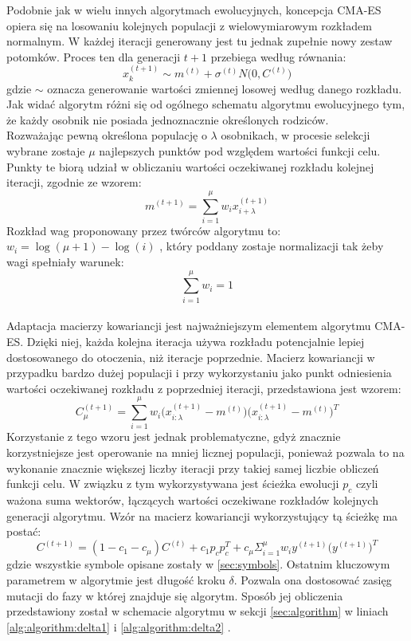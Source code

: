\documentclass[10pt]{article}
\begin{document}
Podobnie jak w wielu innych algorytmach ewolucyjnych, koncepcja CMA-ES opiera się na losowaniu kolejnych populacji z wielowymiarowym rozkładem normalnym. W każdej  iteracji generowany jest tu jednak zupełnie nowy zestaw potomków. Proces ten dla generacji $t+1$ przebiega według równania: $$x_k^{(t+1)} \sim m^{(t)} + \sigma^{(t)}N \big(0,C^{(t)}\big)$$ gdzie $\sim$ oznacza generowanie wartości zmiennej losowej według danego rozkładu. Jak widać algorytm różni się od ogólnego schematu algorytmu ewolucyjnego tym, że każdy osobnik nie posiada jednoznacznie określonych rodziców.\\
Rozważając pewną określona populację o $\lambda$ osobnikach, w procesie selekcji wybrane zostaje $\mu$ najlepszych punktów pod względem wartości funkcji celu. Punkty te biorą udział w obliczaniu wartości oczekiwanej rozkładu kolejnej iteracji, zgodnie ze wzorem:
$$m^{(t+1)} = \sum^{\mu}_{i=1}w_ix_{i+\lambda}^{(t+1)}$$
Rozkład wag proponowany przez twórców algorytmu to: $w_i = \log (\mu + 1) - \log (i)$ , który poddany zostaje normalizacji tak żeby wagi spełniały warunek: $$\sum ^{\mu}_{i=1}w_i = 1$$
\\
Adaptacja macierzy kowariancji jest najważniejszym elementem algorytmu CMA-ES. Dzięki niej, każda kolejna iteracja używa rozkładu potencjalnie lepiej dostosowanego do otoczenia, niż iteracje poprzednie.
Macierz kowariancji w przypadku bardzo dużej populacji i przy wykorzystaniu jako punkt odniesienia wartości oczekiwanej rozkładu z poprzedniej iteracji, przedstawiona jest wzorem: 
 $$C_\mu^{(t+1)} = \sum^\mu_{i=1} w_i \big(x_{i:\lambda}^{(t+1)} - m^{(t)}\big)\big(x_{i:\lambda}^{(t+1)} - m^{(t)}\big)^T$$
Korzystanie z tego wzoru jest jednak problematyczne, gdyż znacznie korzystniejsze jest operowanie na
mniej licznej populacji, ponieważ pozwala to na wykonanie znacznie większej liczby iteracji przy takiej samej liczbie obliczeń funkcji celu. W związku z tym wykorzystywana jest ścieżka ewolucji $p_c$ czyli ważona suma wektorów, łączących wartości
oczekiwane rozkładów kolejnych generacji algorytmu. Wzór na macierz kowariancji wykorzystujący tą ścieżkę ma postać: 
$$C^{(t+1)} = (1-c_1 - c_\mu)C^{(t)} + c_1 p_c p_c^T + c_\mu \Sigma^\mu_{i=1}w_iy^{(t+1)}\big( y^{(t+1)} \big)^T$$ gdzie wszystkie symbole opisane zostały w  \ref{sec:symbols}. Ostatnim kluczowym parametrem w algorytmie jest długość kroku $\delta$. Pozwala ona dostosować zasięg mutacji do fazy w której znajduje się algorytm. Sposób jej obliczenia przedstawiony został w schemacie algorytmu w sekcji \ref{sec:algorithm} w liniach \ref{alg:algorithm:delta1} i \ref{alg:algorithm:delta2} \cite{bobowski}.
\end{document}
